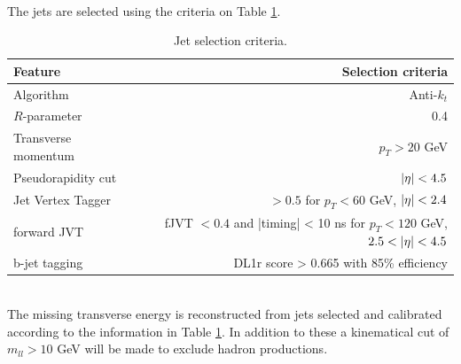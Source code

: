 \documentclass[14pt, a4paper]{book}
\begin{document}
\\The jets are selected using the criteria on Table \ref{tab:jet_selec}.
\begin{table}[!h]
    \centering\caption[Jet selection criteria]{Jet selection criteria.}
    \begin{tabular}{l|r}\midrule\midrule
        Feature                                                                 & Selection criteria        \\\midrule
        Algorithm                                                               & Anti-$k_t$     \\
        $R$-parameter                                                           & 0.4     \\\midrule
        Transverse momentum                                                     & $p_T > 20$ GeV     \\
        Pseudorapidity cut                                                      & $\abs{\eta}<4.5$ \\
        Jet Vertex Tagger                                                       & $>0.5$ for $p_T<60$ GeV, $\abs{\eta}<2.4$ \\
        forward JVT                                                             & fJVT $<0.4$ and |timing| < 10 ns for $p_T<120$ GeV, $2.5<\abs{\eta}<4.5$ \\\midrule
        b-jet tagging                                                           & DL1r score > 0.665 with 85\% efficiency \\\midrule\midrule
    \end{tabular}
    \label{tab:jet_selec}
\end{table}
\\The missing transverse energy is reconstructed from jets selected and calibrated according to the information in Table \ref{tab:jet_selec}. In addition to these a kinematical cut of $m_{ll}>10$ GeV will be made to exclude hadron productions.
\end{document}

